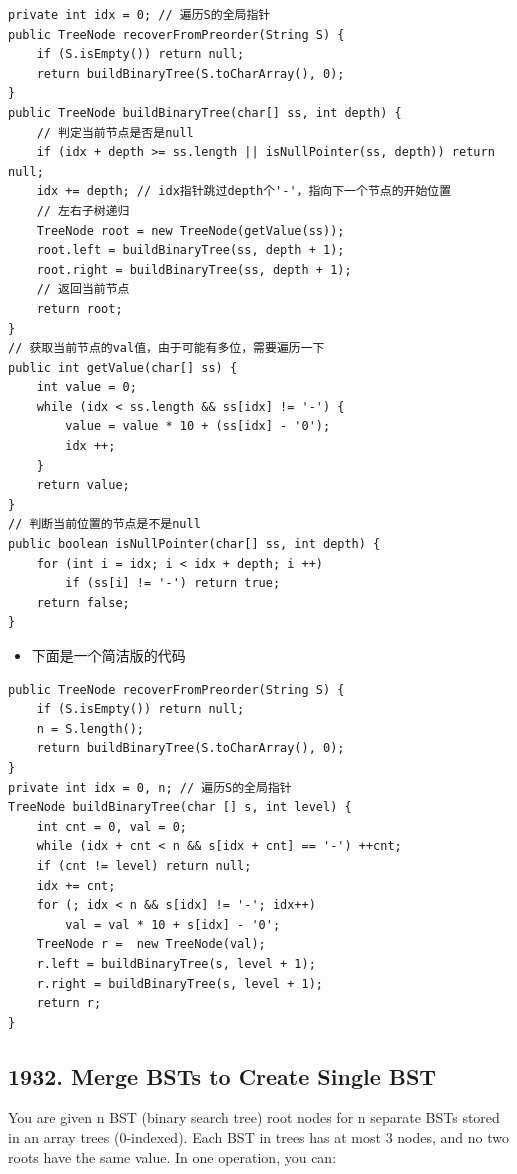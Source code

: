 \documentclass[9pt, b5paaper]{book}
\begin{document}
\begin{enumerate}
\begin{verbatim}
private int idx = 0; // 遍历S的全局指针
public TreeNode recoverFromPreorder(String S) {
    if (S.isEmpty()) return null;
    return buildBinaryTree(S.toCharArray(), 0);
}
public TreeNode buildBinaryTree(char[] ss, int depth) {
    // 判定当前节点是否是null
    if (idx + depth >= ss.length || isNullPointer(ss, depth)) return null;
    idx += depth; // idx指针跳过depth个'-'，指向下一个节点的开始位置
    // 左右子树递归
    TreeNode root = new TreeNode(getValue(ss));
    root.left = buildBinaryTree(ss, depth + 1);
    root.right = buildBinaryTree(ss, depth + 1);
    // 返回当前节点
    return root;
}
// 获取当前节点的val值，由于可能有多位，需要遍历一下
public int getValue(char[] ss) {
    int value = 0;
    while (idx < ss.length && ss[idx] != '-') {
        value = value * 10 + (ss[idx] - '0');
        idx ++;
    }
    return value;
}
// 判断当前位置的节点是不是null
public boolean isNullPointer(char[] ss, int depth) {
    for (int i = idx; i < idx + depth; i ++) 
        if (ss[i] != '-') return true;
    return false;
}
\end{verbatim}
\begin{itemize}
\item 下面是一个简洁版的代码
\end{itemize}
\begin{verbatim}
public TreeNode recoverFromPreorder(String S) {
    if (S.isEmpty()) return null;
    n = S.length();
    return buildBinaryTree(S.toCharArray(), 0);
}
private int idx = 0, n; // 遍历S的全局指针
TreeNode buildBinaryTree(char [] s, int level) {
    int cnt = 0, val = 0;
    while (idx + cnt < n && s[idx + cnt] == '-') ++cnt;
    if (cnt != level) return null;
    idx += cnt;
    for (; idx < n && s[idx] != '-'; idx++) 
        val = val * 10 + s[idx] - '0';
    TreeNode r =  new TreeNode(val);
    r.left = buildBinaryTree(s, level + 1);
    r.right = buildBinaryTree(s, level + 1);
    return r;
}
\end{verbatim}
\end{enumerate}
\subsection{1932. Merge BSTs to Create Single BST}
\label{sec-3-0-5}
You are given n BST (binary search tree) root nodes for n separate BSTs stored in an array trees (0-indexed). Each BST in trees has at most 3 nodes, and no two roots have the same value. In one operation, you can:
\end{document}
